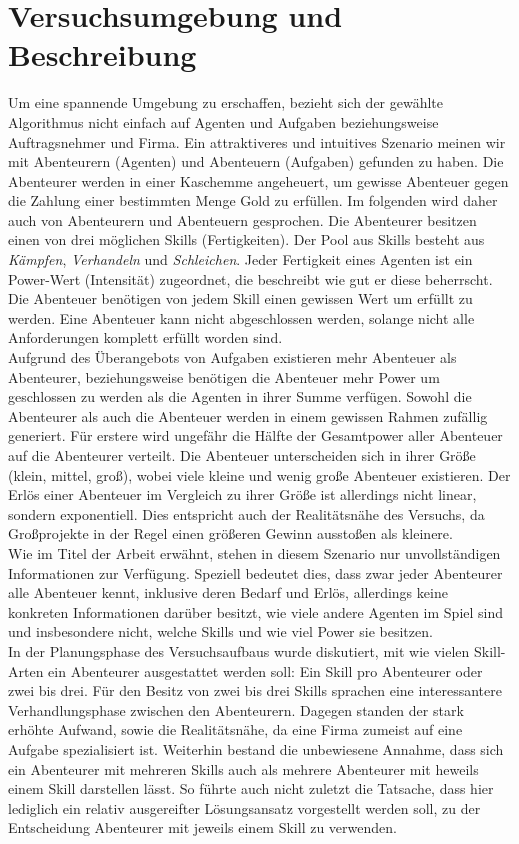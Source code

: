 \documentclass[fleqn,10pt]{SelfArx} %
\begin{document}

\section{Versuchsumgebung und Beschreibung}
\label{sec:Umgebung}

Um eine spannende Umgebung zu erschaffen, bezieht sich der gewählte Algorithmus nicht einfach auf Agenten und Aufgaben beziehungsweise Auftragsnehmer und Firma. Ein attraktiveres und intuitives Szenario meinen wir mit Abenteurern (Agenten) und Abenteuern (Aufgaben) gefunden zu haben. Die Abenteurer werden in einer Kaschemme angeheuert, um gewisse Abenteuer gegen die Zahlung einer bestimmten Menge Gold zu erfüllen. Im folgenden wird daher auch von Abenteurern und Abenteuern gesprochen. Die Abenteurer besitzen einen von drei möglichen Skills (Fertigkeiten). Der Pool aus Skills besteht aus \textit{Kämpfen}, \textit{Verhandeln} und \textit{Schleichen}. Jeder Fertigkeit eines Agenten ist ein Power-Wert (Intensität) zugeordnet, die beschreibt wie gut er diese beherrscht. Die Abenteuer benötigen von jedem Skill einen gewissen Wert um erfüllt zu werden. Eine Abenteuer kann nicht abgeschlossen werden, solange nicht alle Anforderungen komplett erfüllt worden sind.\\
Aufgrund des Überangebots von Aufgaben existieren mehr Abenteuer als Abenteurer, beziehungsweise benötigen die Abenteuer mehr Power um geschlossen zu werden als die Agenten in ihrer Summe verfügen. Sowohl die Abenteurer als auch die Abenteuer werden in einem gewissen Rahmen zufällig generiert. Für erstere wird ungefähr die Hälfte der Gesamtpower aller Abenteuer auf die Abenteurer verteilt. Die Abenteuer unterscheiden sich in ihrer Größe (klein, mittel, groß), wobei viele kleine und wenig große Abenteuer existieren. Der Erlös einer Abenteuer im Vergleich zu ihrer Größe ist allerdings nicht linear, sondern exponentiell. Dies entspricht auch der Realitätsnähe des Versuchs, da Großprojekte in der Regel einen größeren Gewinn ausstoßen als kleinere.\\
Wie im Titel der Arbeit erwähnt, stehen in diesem Szenario nur unvollständigen Informationen zur Verfügung. Speziell bedeutet dies, dass zwar jeder Abenteurer alle Abenteuer kennt, inklusive deren Bedarf und Erlös, allerdings keine konkreten Informationen darüber besitzt, wie viele andere Agenten im Spiel sind und insbesondere nicht, welche Skills und wie viel Power sie besitzen.\\ 
In der Planungsphase des Versuchsaufbaus wurde diskutiert, mit wie vielen Skill-Arten ein Abenteurer ausgestattet werden soll: Ein Skill pro Abenteurer oder zwei bis drei. Für den Besitz von zwei bis drei Skills sprachen eine interessantere Verhandlungsphase zwischen den Abenteurern. Dagegen standen der stark erhöhte Aufwand, sowie die Realitätsnähe, da eine Firma zumeist auf eine Aufgabe spezialisiert ist. Weiterhin bestand die unbewiesene Annahme, dass sich ein Abenteurer mit mehreren Skills auch als mehrere Abenteurer mit heweils einem Skill darstellen lässt. So führte auch nicht zuletzt die Tatsache, dass hier lediglich ein relativ ausgereifter Lösungsansatz vorgestellt werden soll, zu der Entscheidung Abenteurer mit jeweils einem Skill zu verwenden. \\
\end{document}

